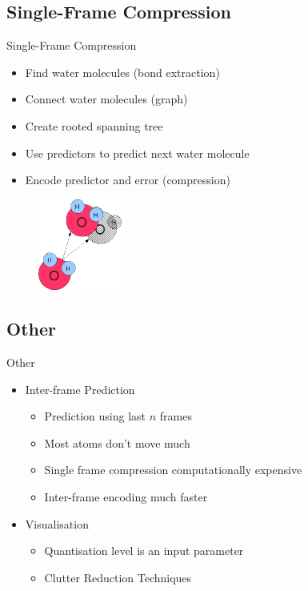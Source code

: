 \documentclass{beamer}
\begin{document}
\subsection{Single-Frame Compression}
\begin{frame}{Single-Frame Compression}
  \begin{itemize}
  \item Find water molecules (bond extraction)
  \item Connect water molecules (graph)
  \item Create rooted spanning tree
  \item Use predictors to predict next water molecule
  \item Encode predictor and error (compression)
  \end{itemize}
  \begin{figure}
    \centering
    \includegraphics[height=30mm]{prediction}
  \end{figure}
\end{frame}


\subsection{Other}
\begin{frame}{Other}
  \begin{itemize}
  \item Inter-frame Prediction
    \begin{itemize}
    \item Prediction using last $n$ frames
    \item Most atoms don't move much
    \item Single frame compression computationally expensive
    \item Inter-frame encoding much faster
    \end{itemize}
  \item Visualisation
    \begin{itemize}
    \item Quantisation level is an input parameter
    \item Clutter Reduction Techniques
    \end{itemize}
  \end{itemize}
\end{frame}
\end{document}
